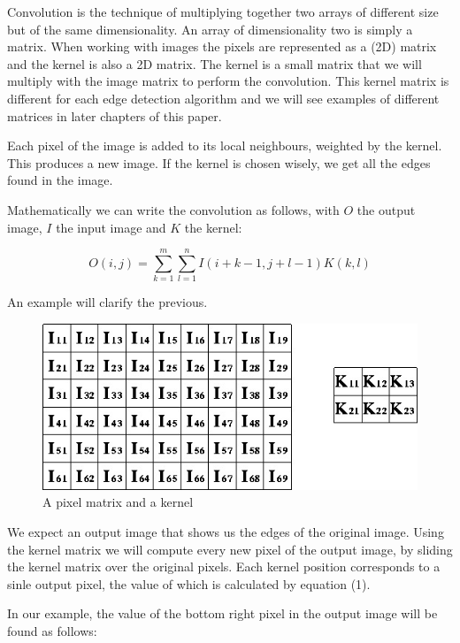 \documentclass[12pt]{article}
\begin{document}
Convolution is the technique of multiplying together two arrays of different size but of the same dimensionality. An array of dimensionality two is simply a matrix. When working with images the pixels are represented as a (2D) matrix and the kernel is also a 2D matrix.
The kernel is a small matrix that we will multiply with the image matrix to perform the convolution. This kernel matrix is different for each edge detection algorithm and we will see examples of different matrices in later chapters of this paper. 
\newline

Each pixel of the image is added to its local neighbours, weighted by the kernel. This produces a new image. If the kernel is chosen wisely, we get all the edges found in the image.
\newline

Mathematically we can write the convolution as follows, with $O$ the output image, $I$ the input image and $K$ the kernel:

\begin{equation}
O(i, j) =  \sum\limits_{k=1}^m\sum\limits_{l=1}^n I(i + k - 1, j + l - 1)K(k,l)
\end{equation}
\newline

An example will clarify the previous.

\begin{figure}[h]
\centering
\includegraphics[scale = 0.5]{img/convolution}
\caption{A pixel matrix and a kernel}
\end{figure}

We expect an output image that shows us the edges of the original image. Using the kernel matrix we will compute every new pixel of the output image, by sliding the kernel matrix over the original pixels. Each kernel position corresponds to a sinle output pixel, the value of which is calculated by equation (1).

In our example, the value of the bottom right pixel in the output image will be found as follows:
\end{document}
